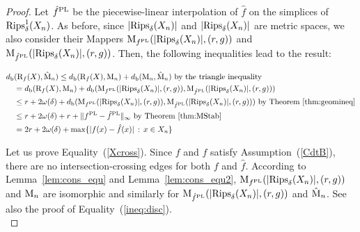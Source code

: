 \begin{proof}
Let ${\hat f}^{\rm PL}$ be the piecewise-linear
interpolation of $\hat f$ on the simplices of $\mathrm{Rips}^1_\delta(X_n)$.
As before, since $|\mathrm{Rips}_\delta(X_n)|$
and $|\mathrm{Rips}_\delta(X_n)|$
are metric spaces, we also consider 
their Mappers $\mathrm{M}_{{f}^{\rm PL}}(|\mathrm{Rips}_\delta(X_n)|,(r,g))$ and $\mathrm{M}_{{\hat f}^{\rm PL}}(|\mathrm{Rips}_\delta(X_n)|,(r,g))$. 
Then, the following inequalities lead to the result:

\begin{align}
d_{\rm b} & (\mathrm{R}_f(X),\hat{\mathrm{M}}_n)\leq d_{\rm b}(\mathrm{R}_f(X),\mathrm{M}_n) + d_{\rm b}(\mathrm{M}_n,\hat{\mathrm{M}}_n)\text{ by the triangle inequality}\nonumber\\
&=d_{\rm b}(\mathrm{R}_f(X),\mathrm{M}_n) + d_{\rm b}(\mathrm{M}_{{f}^{\rm PL}}(|\mathrm{Rips}_\delta(X_n)|,(r,g)),\mathrm{M}_{{\hat f}^{\rm PL}}(|\mathrm{Rips}_\delta(X_n)|,(r,g)))\label{Xcross} \\
&\leq r + 2\omega(\delta) + d_{\rm b}(\mathrm{M}_{{f}^{\rm PL}}(|\mathrm{Rips}_\delta(X_n)|,(r,g)),\mathrm{M}_{{\hat f}^{\rm PL}}(|\mathrm{Rips}_\delta(X_n)|,(r,g)))\text{ by Theorem~\ref{thm:geomineq}}\nonumber\\
&\leq r + 2\omega(\delta) + r + \|{f}^{\rm PL}-{\hat f}^{\rm PL}\|_\infty \text{ by Theorem~\ref{thm:MStab}}\nonumber\\
&= 2r + 2\omega(\delta) + \max\{|f(x)-\hat f(x)|\,:\,x\in X_n\}\nonumber
\end{align}

Let us prove Equality~(\ref{Xcross}). Since $f$ and $\hat f$ satisfy Assumption~(\ref{CdtB}), %
there are no intersection-crossing edges for both $f$ and $\hat f$.
According to Lemma~\ref{lem:cons_equ} and Lemma~\ref{lem:cons_equ2}, $\mathrm{M}_{{f}^{\rm PL}}(|\mathrm{Rips}_\delta(X_n)|,(r,g))$ and $\mathrm{M}_n$ are isomorphic
and similarly for $\mathrm{M}_{{\hat f}^{\rm PL}}(|\mathrm{Rips}_\delta(X_n)|,(r,g))$ and $\hat {\mathrm{M}}_n$. See also the proof of Equality~(\ref{ineq:disc}). \\
\end{proof}


























